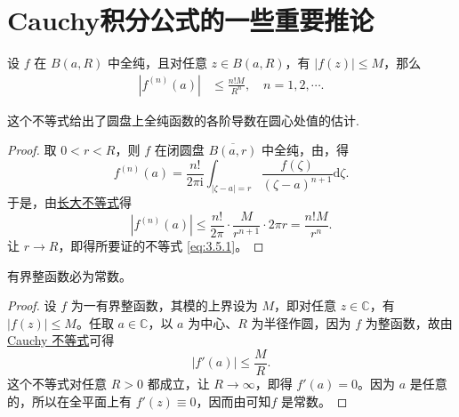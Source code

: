 \documentclass[../../main.tex]{subfiles}%
\begin{document}
\section{Cauchy积分公式的一些重要推论}

\begin{theorem}[Cauchy不等式]\label{theorem:Cauchy不等式(离散版)-复变函数}
设 \( f \) 在 \( B(a,R) \) 中全纯，且对任意 \( z \in B(a,R) \)，有 \( |f(z)| \leqslant M \)，那么
\begin{align}
|f^{(n)}(a)| &\leqslant \frac{n!M}{R^n}, \quad n = 1,2,\cdots. \label{eq:3.5.1}
\end{align}
\end{theorem}
\begin{note}
这个不等式给出了圆盘上全纯函数的各阶导数在圆心处值的估计.
\end{note}
\begin{proof}

取 \( 0 < r < R \)，则 \( f \) 在闭圆盘 \( \overline{B(a,r)} \) 中全纯，由，得
\[
f^{(n)}(a) = \frac{n!}{2\pi \mathrm{i}} \int_{|\zeta - a| = r} \frac{f(\zeta)}{(\zeta - a)^{n + 1}} \mathrm{d}\zeta.
\]
于是，由\hyperref[theorem:长大不等式]{长大不等式}得
\[
|f^{(n)}(a)| \leqslant \frac{n!}{2\pi} \cdot \frac{M}{r^{n + 1}} \cdot 2\pi r = \frac{n!M}{r^n}.
\]
让 \( r \to R \)，即得所要证的不等式 \eqref{eq:3.5.1}。

\end{proof}

\begin{theorem}[Liouville定理]\label{theorem:Liouville(刘维尔)定理}
有界整函数必为常数。
\end{theorem}
\begin{proof}

设 \( f \) 为一有界整函数，其模的上界设为 \( M \)，即对任意 \( z \in \mathbb{C} \)，有 \( |f(z)| \leqslant M \)。任取 \( a \in \mathbb{C} \)，以 \( a \) 为中心、\( R \) 为半径作圆，因为 \( f \) 为整函数，故由 \hyperref[theorem:Cauchy不等式(离散版)-复变函数]{Cauchy 不等式}可得
\[
|f'(a)| \leqslant \frac{M}{R}.
\]
这个不等式对任意 \( R > 0 \) 都成立，让 \( R \to \infty \)，即得 \( f'(a) = 0 \)。因为 \( a \) 是任意的，所以在全平面上有 \( f'(z) \equiv 0 \)，因而由可知\( f \) 是常数。

\end{proof}
\end{document}
